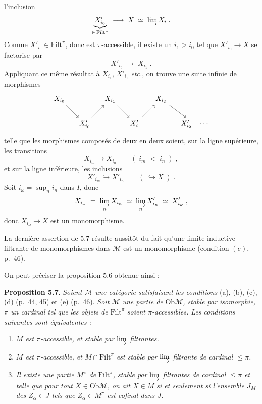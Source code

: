 \documentclass[11pt]{article}
\newcommand{\printedpage}[1]{\marginpar{\footnotesize p.~#1}}
\newcommand{\msp}[1]{\marginpar{\footnotesize [#1]}}
\newcommand{\Filt}{\mathrm{Filt}}
\newcommand{\Ob}{\mathrm{Ob}}
\newcommand{\M}{\mathcal{M}}
\begin{document}
\printedpage{34}
l'inclusion
\[
\underbrace{X'_{i_0}}_{\in\, \Filt^\pi} \;\longrightarrow\; X \;\simeq\; \varinjlim X_i \;.
\]
Comme $X'_{i_0} \in \Filt^\pi$, donc est $\pi$-accessible, il existe un $i_1 > i_0$ tel que $X'_{i_0} \longrightarrow X$ se factorise par
\[
X'_{i_0} \;\longrightarrow\; X_{i_1} \;.
\]
Appliquant ce même résultat à $X_{i_1}$, $X'_{i_1}$ \textit{etc.}, on trouve une suite infinie de morphismes
\[
\begin{tikzcd}[column sep=small]
X_{i_0} \arrow[dr] & & X_{i_1} \arrow[dr] & & X_{i_2} \arrow[dr] & \\
& X'_{i_0} \arrow[ur] & & X'_{i_1} \arrow[ur] & & X'_{i_2} \quad \cdots
\end{tikzcd}
\]
telle que les morphismes composés de deux en deux soient, sur la ligne supérieure, les transitions
\[
X_{i_m} \longrightarrow X_{i_n} \qquad (\; i_m \;<\; i_n \;) \;,
\]
et sur la ligne inférieure, les inclusions
\[
X'_{i_m} \hookrightarrow X'_{i_n} \qquad (\; \hookrightarrow X \;) \;.
\]
Soit $i_\omega = \sup_n i_n$ dans $I$, donc
\[
X_{i_\omega} \;=\; \varinjlim_{n} X_{i_n} \;\simeq\; \varinjlim_{n} X'_{i_n} \;\simeq\; X'_{i_\omega} \;,
\]
donc $X_{i_\omega} \longrightarrow X$ est un monomorphisme.

\msp{page 57}

La dernière assertion de 5.7 résulte aussitôt du fait qu'une limite inductive filtrante de monomorphismes dans $\M$ est un monomorphisme (condition $(e)$, p.~46).

On peut préciser la proposition 5.6 obtenue ainsi :

\textbf{Proposition 5.7}. \textit{Soient $\M$ une catégorie satisfaisant les conditions} (a), (b), (c), (d) (p.~44, 45) et (e) (p.~46). \textit{Soit $\M$ une partie de} $\Ob\M$\textit{, stable par isomorphie, $\pi$ un cardinal tel que les objets de} $\Filt^\pi$ \textit{soient $\pi$-accessibles. Les conditions suivantes sont équivalentes :} %

\begin{enumerate}[label={}]
\item[a)] \textit{$M$ est $\pi$-accessible, et stable par $\varinjlim$ filtrantes.}
\item[b)] \textit{$M$ est $\pi$-accessible, et $M \cap \Filt^\pi$ est stable par $\varinjlim$ filtrante de cardinal $\leq \pi$.}
\item[c)] \textit{Il existe une partie $M^\pi$ de} $\Filt^\pi$\textit{, stable par $\varinjlim$ filtrantes de cardinal $\leq \pi$ et telle que pour tout $X \in \Ob\M$, on ait $X \in M$ si et seulement si l'ensemble $J_M$ des $Z_\alpha \in J$ tels que $Z_\alpha \in M^\pi$ est cofinal dans $J$.}
\end{enumerate}
\end{document}
